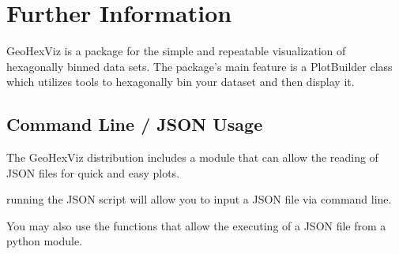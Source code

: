 \documentclass[letterpaper,10pt,english]{sphinxmanual}
\begin{document}
\chapter{Further Information}
\label{\detokenize{index:further-information}}
\sphinxAtStartPar
GeoHexViz is a package for the simple and repeatable visualization of
hexagon\sphinxhyphen{}ally binned data sets.
The package’s main feature is a PlotBuilder class which utilizes tools
to hexagon\sphinxhyphen{}ally bin your dataset and then display it.


\section{Command Line / JSON Usage}
\label{\detokenize{index:command-line-json-usage}}
\sphinxAtStartPar
The GeoHexViz distribution includes a module that can allow the reading
of JSON files for quick and easy plots.

\begin{sphinxVerbatim}[commandchars=\\\{\}]
   
     
     
   
     
     
     
   
\end{sphinxVerbatim}

\sphinxAtStartPar
running the JSON script will allow you to input a JSON file via command
line.

\sphinxAtStartPar
You may also use the functions that allow the executing of a JSON file
from a python module.

\begin{sphinxVerbatim}[commandchars=\\\{\}]
   

\end{sphinxVerbatim}
\end{document}
